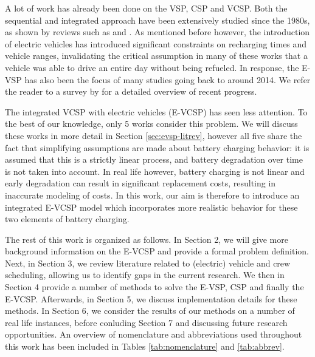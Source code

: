 \documentclass[]{article}
\begin{document}
\noindent A lot of work has already been done on the VSP, CSP and VCSP. Both the sequential and integrated approach have been extensively studied since the 1980s, as shown by reviews such as \citet{Ibarra-Rojas2015} and \citet{Ge2024}. As mentioned before however, the introduction of electric vehicles has introduced significant constraints on recharging times and vehicle ranges, invalidating the critical assumption in many of these works that a vehicle was able to drive an entire day without being refueled. In response, the E-VSP has also been the focus of many studies going back to around 2014. We refer the reader to a survey by \citet{Perumal2022LitRev} for a detailed overview of recent progress.

The integrated VCSP with electric vehicles (E-VCSP) has seen less attention. To the best of our knowledge, only 5 works consider this problem. We will discuss these works in more detail in Section \ref{sec:evsp-litrev}, however all five share the fact that simplifying assumptions are made about battery charging behavior: it is assumed that this is a strictly linear process, and battery degradation over time is not taken into account. In real life however, battery charging is not linear and early degradation can result in significant replacement costs, resulting in inaccurate modeling of costs. In this work, our aim is therefore to introduce an integrated E-VCSP model which incorporates more realistic behavior for these two elements of battery charging.

The rest of this work is organized as follows. In Section 2, we will give more background information on the E-VCSP and provide a formal problem definition. Next, in Section 3, we review literature related to (electric) vehicle and crew scheduling, allowing us to identify gaps in the current research. We then in Section 4 provide a number of methods to solve the E-VSP, CSP and finally the E-VCSP. Afterwards, in Section 5, we discuss implementation details for these methods. In Section 6, we consider the results of our methods on a number of real life instances, before conluding Section 7 and discussing future research opportunities. An overview of nomenclature and abbreviations used throughout this work has been included in Tables \ref{tab:nomenclature} and \ref{tab:abbrev}.
\end{document}
